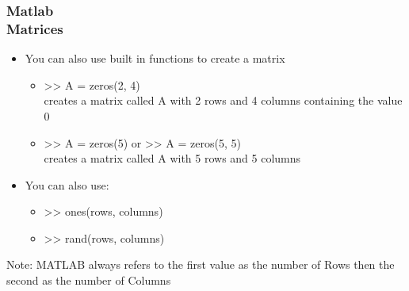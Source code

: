 \documentclass[hyperref={pdfpagelabels=true}]{beamer}
\begin{document}
\begin{frame}
\frametitle{Matlab \\ {\small Matrices}}
\begin{itemize}
\item You can also use built in functions to create a matrix
  \begin{itemize}
  \item >> \textcolor{mygreen}{A = zeros(2, 4)} \\
		creates a matrix called A with 2 rows and 4 columns 	containing the value 0
  \item >> \textcolor{mygreen}{A = zeros(5)} or >> \textcolor{mygreen}{A = zeros(5, 5)}  \\
		creates a matrix called A with 5 rows and 5 columns
  \end{itemize}
\item You can also use:
  \begin{itemize}
  \item >> \textcolor{mygreen}{ones(rows, columns)}
  \item >> \textcolor{mygreen}{rand(rows, columns)}
  \end{itemize}
\end{itemize}
\noindent\makebox[\linewidth]{\rule{10 cm}{0.1pt}}
Note: MATLAB always refers to the first value as the number of Rows then the second as the number of Columns
\noindent\makebox[\linewidth]{\rule{10 cm}{0.1pt}}
\end{frame}
\end{document}
